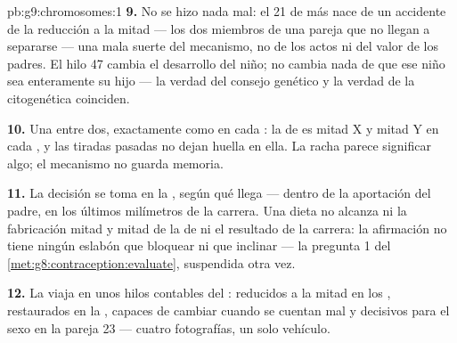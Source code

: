 \begin{solution}{pb:g9:chromosomes:1}
\textbf{9.} No se hizo nada mal: el 21 de más nace de un accidente de
la reducción a la mitad --- los dos miembros de una pareja que no
llegan a separarse --- una mala suerte del mecanismo, no de los actos
ni del valor de los padres. El hilo 47 cambia el desarrollo del niño;
no cambia nada de que ese niño sea enteramente su hijo --- la verdad
del consejo genético y la verdad de la citogenética coinciden.

\textbf{10.} Una entre dos, exactamente como en cada : la
 de  es mitad X y mitad Y en cada ,
y las tiradas pasadas no dejan huella en ella. La racha parece
significar algo; el mecanismo no guarda memoria.

\textbf{11.} La decisión se toma en la , según qué
 llega --- dentro de la aportación del padre, en los
últimos milímetros de la carrera. Una dieta no alcanza ni la
fabricación mitad y mitad de la  de  ni el
resultado de la carrera: la afirmación no tiene ningún eslabón que
bloquear ni que inclinar --- la pregunta 1 del
\cref{met:g8:contraception:evaluate}, suspendida otra vez.

\textbf{12.} La  viaja en unos hilos contables del :
reducidos a la mitad en los , restaurados en la ,
capaces de cambiar  cuando se cuentan mal y decisivos para el
sexo en la pareja 23 --- cuatro fotografías, un solo vehículo.
\end{solution}
